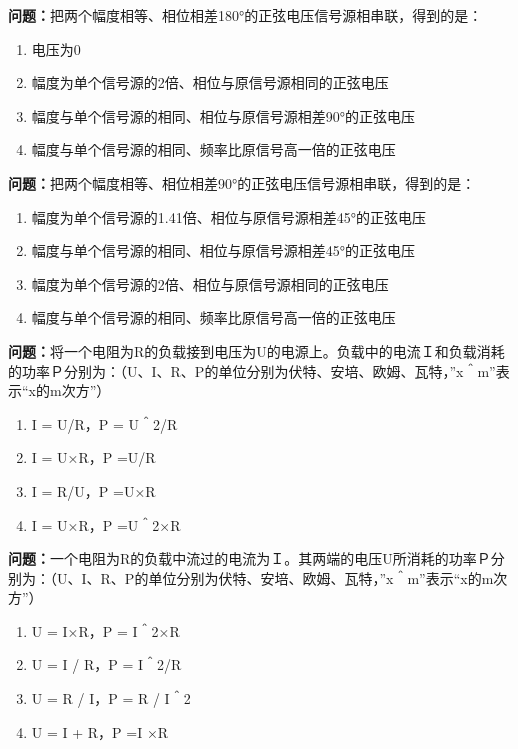 \bigskip


\noindent\textbf{问题：}把两个幅度相等、相位相差180°的正弦电压信号源相串联，得到的是：
\begin{enumerate}[label=\Alph*), leftmargin=3em]
\item 电压为0
\item 幅度为单个信号源的2倍、相位与原信号源相同的正弦电压
\item 幅度与单个信号源的相同、相位与原信号源相差90°的正弦电压
\item 幅度与单个信号源的相同、频率比原信号高一倍的正弦电压
\end{enumerate}

\bigskip


\noindent\textbf{问题：}把两个幅度相等、相位相差90°的正弦电压信号源相串联，得到的是：
\begin{enumerate}[label=\Alph*), leftmargin=3em]
\item 幅度为单个信号源的1.41倍、相位与原信号源相差45°的正弦电压
\item 幅度与单个信号源的相同、相位与原信号源相差45°的正弦电压
\item 幅度为单个信号源的2倍、相位与原信号源相同的正弦电压
\item 幅度与单个信号源的相同、频率比原信号高一倍的正弦电压
\end{enumerate}

\bigskip


\noindent\textbf{问题：}将一个电阻为R的负载接到电压为U的电源上。负载中的电流Ｉ和负载消耗的功率Ｐ分别为：（U、I、R、P的单位分别为伏特、安培、欧姆、瓦特，”x＾m”表示“x的m次方”）
\begin{enumerate}[label=\Alph*), leftmargin=3em]
\item I = U/R，P = U＾2/R
\item I = U×R，P =U/R
\item I = R/U，P =U×R
\item I = U×R，P =U＾2×R
\end{enumerate}

\bigskip


\noindent\textbf{问题：}一个电阻为R的负载中流过的电流为Ｉ。其两端的电压U所消耗的功率Ｐ分别为：（U、I、R、P的单位分别为伏特、安培、欧姆、瓦特，”x＾m”表示“x的m次方”）
\begin{enumerate}[label=\Alph*), leftmargin=3em]
\item U = I×R，P = I＾2×R
\item U = I / R，P = I＾2/R
\item U = R / I，P = R / I＾2
\item U = I + R，P =I ×R
\end{enumerate}

